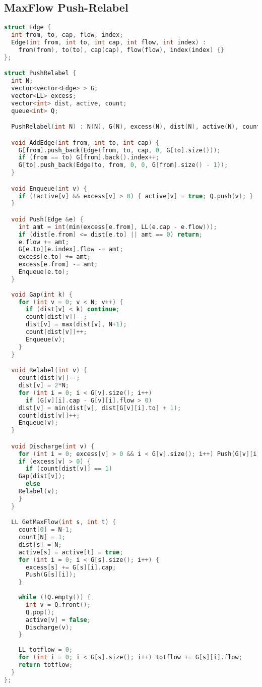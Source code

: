 \subsection{MaxFlow Push-Relabel}
\begin{lstlisting}[language=C++]
struct Edge {
  int from, to, cap, flow, index;
  Edge(int from, int to, int cap, int flow, int index) :
    from(from), to(to), cap(cap), flow(flow), index(index) {}
};

struct PushRelabel {
  int N;
  vector<vector<Edge> > G;
  vector<LL> excess;
  vector<int> dist, active, count;
  queue<int> Q;

  PushRelabel(int N) : N(N), G(N), excess(N), dist(N), active(N), count(2*N) {}

  void AddEdge(int from, int to, int cap) {
    G[from].push_back(Edge(from, to, cap, 0, G[to].size()));
    if (from == to) G[from].back().index++;
    G[to].push_back(Edge(to, from, 0, 0, G[from].size() - 1));
  }

  void Enqueue(int v) { 
    if (!active[v] && excess[v] > 0) { active[v] = true; Q.push(v); } 
  }

  void Push(Edge &e) {
    int amt = int(min(excess[e.from], LL(e.cap - e.flow)));
    if (dist[e.from] <= dist[e.to] || amt == 0) return;
    e.flow += amt;
    G[e.to][e.index].flow -= amt;
    excess[e.to] += amt;    
    excess[e.from] -= amt;
    Enqueue(e.to);
  }
  
  void Gap(int k) {
    for (int v = 0; v < N; v++) {
      if (dist[v] < k) continue;
      count[dist[v]]--;
      dist[v] = max(dist[v], N+1);
      count[dist[v]]++;
      Enqueue(v);
    }
  }

  void Relabel(int v) {
    count[dist[v]]--;
    dist[v] = 2*N;
    for (int i = 0; i < G[v].size(); i++) 
      if (G[v][i].cap - G[v][i].flow > 0)
	dist[v] = min(dist[v], dist[G[v][i].to] + 1);
    count[dist[v]]++;
    Enqueue(v);
  }

  void Discharge(int v) {
    for (int i = 0; excess[v] > 0 && i < G[v].size(); i++) Push(G[v][i]);
    if (excess[v] > 0) {
      if (count[dist[v]] == 1) 
	Gap(dist[v]); 
      else
	Relabel(v);
    }
  }

  LL GetMaxFlow(int s, int t) {
    count[0] = N-1;
    count[N] = 1;
    dist[s] = N;
    active[s] = active[t] = true;
    for (int i = 0; i < G[s].size(); i++) {
      excess[s] += G[s][i].cap;
      Push(G[s][i]);
    }
    
    while (!Q.empty()) {
      int v = Q.front();
      Q.pop();
      active[v] = false;
      Discharge(v);
    }
    
    LL totflow = 0;
    for (int i = 0; i < G[s].size(); i++) totflow += G[s][i].flow;
    return totflow;
  }
};
\end{lstlisting}